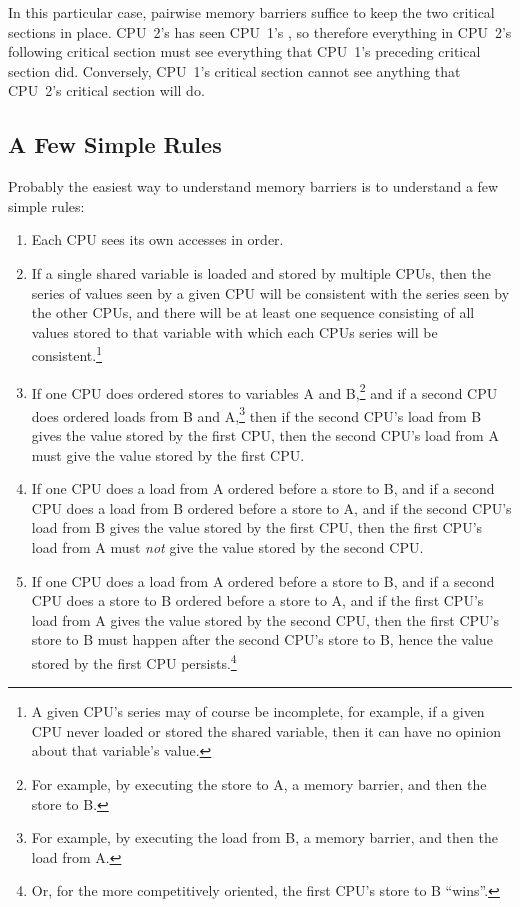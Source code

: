 In this particular case, pairwise memory barriers suffice to keep
the two critical sections in place.
CPU~2's  has seen CPU~1's ,
so therefore everything in CPU~2's following critical section must see
everything that CPU~1's preceding critical section did.
Conversely, CPU~1's critical section cannot see anything that CPU~2's
critical section will do.

\subsection{A Few Simple Rules}
\label{sec:advsync:A Few Simple Rules}

Probably the easiest way to understand memory barriers is to understand
a few simple rules:

\begin{enumerate}
\item	Each CPU sees its own accesses in order.
\item	If a single shared variable is loaded and stored by multiple
	CPUs, then the series of values seen by a given CPU will be
	consistent with the series seen by the other CPUs, and there
	will be at least one sequence consisting of all values stored
	to that variable with which each CPUs series will be
	consistent.\footnote{
		A given CPU's series may of course be incomplete,
		for example, if a given CPU never loaded or stored
		the shared variable, then it can have no opinion about
		that variable's value.}
\item	If one CPU does ordered stores to variables A and B,\footnote{
		For example, by executing the store to A, a
		memory barrier, and then the store to B.}
	and if a second CPU does ordered loads from B and A,\footnote{
		For example, by executing the load from B, a
		memory barrier, and then the load from A.}
	then if the second CPU's load from B gives the value stored
	by the first CPU, then the second CPU's load from A must
	give the value stored by the first CPU.
\item	If one CPU does a load from A ordered before a store to B,
	and if a second CPU does a load from B ordered before a store to A,
	and if the second CPU's load from B gives the value stored by
	the first CPU, then the first CPU's load from A must \emph{not}
	give the value stored by the second CPU.
\item	If one CPU does a load from A ordered before a store to B,
	and if a second CPU does a store to B ordered before a
	store to A, and if the first CPU's load from A gives
	the value stored by the second CPU, then the first CPU's
	store to B must happen after the second CPU's store to B,
	hence the value stored by the first CPU persists.\footnote{
		Or, for the more competitively oriented, the first
		CPU's store to B ``wins''.}
\end{enumerate}

